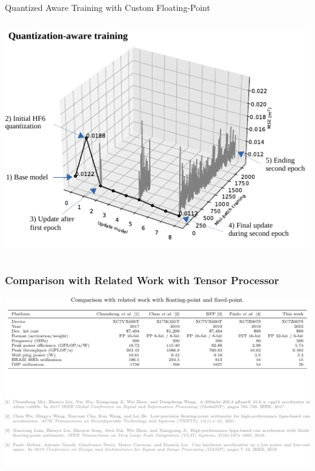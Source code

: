\begin{frame}{Quantized Aware Training with Custom Floating-Point}
\begin{columns}
		\centering
		\includegraphics[width=0.65\linewidth]{slides/figures/QAT.pdf} %
	\end{columns}
\end{frame}

\begin{frame}
	\frametitle{Comparison with Related Work with Tensor Processor} %
	\begin{center}
		\includegraphics[width=\textwidth]{slides/figures/cnn_related_work.pdf} %
	\end{center}
\end{frame}

\backupend